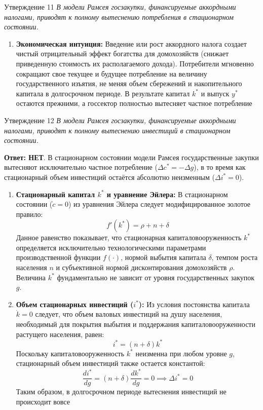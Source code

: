 \documentclass[10pt,a4paper]{article}
\newcommand{\qnet}{\textbf{\color{nored}Ответ: НЕТ}}
\newenvironment{answer}[2]{%
  \begin{qbox}{Утверждение #1}
  \textit{#2}\par\smallskip
}{%
  \end{qbox}\vspace{2pt}
}
\begin{document}
\begin{answer}{11}{В модели Рамсея госзакупки, финансируемые аккордными налогами, приводят к полному вытеснению потребления в стационарном состоянии.}
\begin{enumerate}
    \item \textbf{Экономическая интуиция:}
    Введение или рост аккордного налога создает чистый отрицательный эффект богатства для домохозяйств (снижает приведенную стоимость их располагаемого дохода). Потребители мгновенно сокращают свое текущее и будущее потребление на величину государственного изъятия, не меняя объем сбережений и накопительного капитала в долгосрочном периоде. В результате капитал $k^*$ и выпуск $y^*$ остаются прежними, а госсектор полностью вытесняет частное потребление
\end{enumerate}
\end{answer}

\begin{answer}{12}{В модели Рамсея госзакупки, финансируемые аккордными налогами, приводят к полному вытеснению инвестиций в стационарном состоянии.}
\qnet. В стационарном состоянии модели Рамсея государственные закупки вытесняют исключительно частное потребление ($\Delta c^* = -\Delta g$), в то время как стационарный объем инвестиций остаётся абсолютно неизменным ($\Delta i^* = 0$).

\begin{enumerate}
    \item \textbf{Стационарный капитал $k^*$ и уравнение Эйлера:}
    В стационарном состоянии ($\dot{c} = 0$) из уравнения Эйлера следует модифицированное золотое правило:
    \[
    f'(k^*) = \rho + n + \delta
    \]
    Данное равенство показывает, что стационарная капиталовооруженность $k^*$ определяется исключительно технологическими параметрами производственной функции $f(\cdot)$, нормой выбытия капитала $\delta$, темпом роста населения $n$ и субъективной нормой дисконтирования домохозяйств $\rho$. Величина $k^*$ фундаментально не зависит от уровня государственных закупок $g$.

    \item \textbf{Объем стационарных инвестиций ($i^*$):}
    Из условия постоянства капитала $\dot{k} = 0$ следует, что объем валовых инвестиций на душу населения, необходимый для покрытия выбытия и поддержания капиталовооруженности растущего населения, равен:
    \[
    i^* = (n + \delta)k^*
    \]
    Поскольку капиталовооруженность $k^*$ неизменна при любом уровне $g$, стационарный объем инвестиций также остается константой:
    \[
    \frac{di^*}{dg} = (n + \delta)\frac{dk^*}{dg} = 0 \implies \Delta i^* = 0
    \]
    Таким образом, в долгосрочном периоде вытеснения инвестиций не происходит вовсе


\end{enumerate}
\end{answer}
\end{document}
